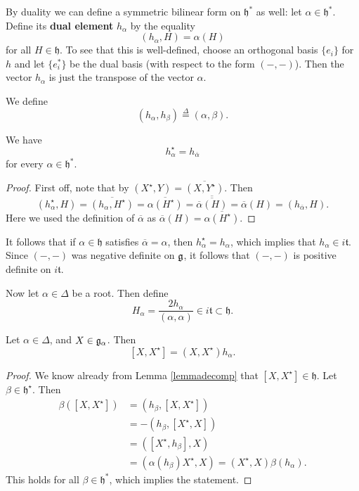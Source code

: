 \documentclass[11pt, english]{article}
\begin{document}
By duality we can define a symmetric bilinear form on $\mathfrak h^\ast$ as well: let $\alpha \in \mathfrak h^\ast$. Define its \textbf{dual element} $h_\alpha$ by the equality
$$
(h_\alpha, H) = \alpha(H)
$$
for all $H \in \mathfrak h$. To see that this is well-defined, choose an orthogonal basis $\{ e_i \}$ for $h$ and let $\{ e_i^\ast \}$ be the dual basis (with respect to the form $(-,-)$). Then the vector $h_\alpha$ is just the transpose of the vector $\alpha$. 

We define 
$$
(h_\alpha, h_\beta) \stackrel{\Delta}{=} (\alpha,\beta).
$$


\begin{lemma}
We have
$$
h_\alpha^\star = h_{\overline \alpha}
$$
for every $\alpha \in \mathfrak h^\ast$.
\end{lemma}
\begin{proof}
First off, note that by $(X^\star, Y) = \overline{(X,Y^\star)}$. Then
$$
(h_\alpha^\star, H) = \overline{(h_\alpha, H^\star)} = \overline{\alpha(H^\star)} = \overline{\overline{\overline \alpha(H)}} = \overline{\alpha} (H) = (h_{\overline \alpha},H).
$$
Here we used the definition of $\overline \alpha$ as $\overline \alpha(H) = \overline{\alpha(H^\star)}$.
\end{proof}

It follows that if $\alpha \in \mathfrak h$ satisfies $\overline \alpha = \alpha$, then $h_\alpha^\star = h_\alpha$, which implies that $h_\alpha \in i \mathfrak t$. Since $(-,-)$ was negative definite on $\mathfrak g$, it follows that $(-,-)$ is positive definite on $i \mathfrak t$. 

Now let $\alpha \in \Delta$ be a root. Then define
$$
H_\alpha = \frac{2 h_\alpha}{(\alpha,\alpha)} \in i \mathfrak t \subset \mathfrak h.
$$

\begin{lemma}
Let $\alpha \in \Delta$, and $X \in \mathfrak g_\alpha$. Then
$$
[X,X^\star] = (X,X^\star) h_\alpha.
$$
\end{lemma}
\begin{proof}
We know already from Lemma \eqref{lemmadecomp} that $[X,X^\star] \in \mathfrak h$. Let $\beta \in \mathfrak h^\star$. Then
\begin{align*}
\beta([X,X^\star]) &= (h_\beta,[X,X^\star]) \\
&= -(h_\beta,[X^\star,X]) \\
&= ([X^\star, h_\beta],X) \\
&= (\alpha(h_\beta) X^\star,X) = (X^\star,X) \beta(h_\alpha).
\end{align*}
This holds for all $\beta \in \mathfrak h^\ast$, which implies the statement.
\end{proof}
\end{document}
